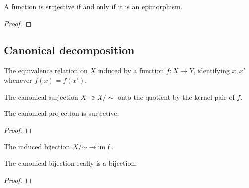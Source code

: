 \begin{exercise}[I.2.5]
  \label{exer:prelims:2.5}
  \leanok
  A function is surjective if and only if it is an epimorphism.
\end{exercise}
\begin{proof}
  \leanok
\end{proof}

\subsection{Canonical decomposition}
\label{subsec:prelims:canonical-decomposition}

\begin{definition}
  \label{def:prelims:kernel-pair-setoid}
  \leanok
  The equivalence relation on $X$ induced by a function $f : X \to Y$,
  identifying $x, x'$ whenever $f(x) = f(x')$.
\end{definition}

\begin{definition}
  \label{def:prelims:canonical-projection}
  \leanok
  The canonical surjection $X \twoheadrightarrow X/{\sim}$ onto the
  quotient by the kernel pair of $f$.
\end{definition}

\begin{proposition}
  \label{prop:prelims:canonical-projection-surjective}
  \leanok
  The canonical projection is surjective.
\end{proposition}
\begin{proof}
  \leanok
\end{proof}

\begin{definition}
  \label{def:prelims:canonical-bijection}
  \leanok
  The induced bijection $X/{\sim} \to \operatorname{im} f$.
\end{definition}

\begin{proposition}
  \label{prop:prelims:canonical-bijection-bijective}
  \leanok
  The canonical bijection really is a bijection.
\end{proposition}
\begin{proof}
  \leanok
\end{proof}

